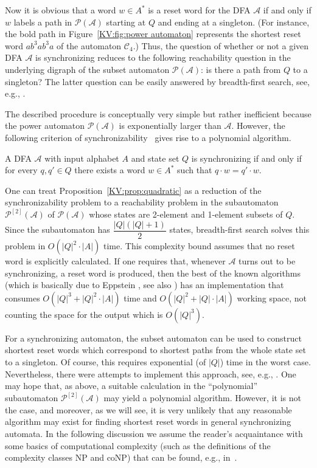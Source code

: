 \documentclass{irmaart}
\newcommand{\sa}{synchronizing au\-tom\-a\-ta}
\newcommand{\san}{synchronizing au\-tom\-a\-ton}
\begin{document}
Now it is obvious that a word $w\in A^*$ is a reset word for the
DFA $\mathcal{A}$ if and only if $w$ labels a path in
$\mathcal{P}(\mathcal{A})$ starting at $Q$ and ending at a
singleton. (For instance, the bold path in
Figure~\ref{KV:fig:power automaton} represents the shortest reset
word $ab^3ab^3a$ of the automaton $\mathcal{C}_4$.) Thus, the
question of whether or not a given DFA $\mathcal{A}$ is
synchronizing reduces to the following reachability question in
the underlying digraph of the subset automaton
$\mathcal{P}(\mathcal{A})$: is there a path from $Q$ to a
singleton? The latter question can be easily answered by
breadth-first search,  see, e.g.,
\cite[Section~22.2]{Cormen&Leiserson&Rivest&Stein:2001}.

The described procedure is conceptually very simple but rather
inefficient because the power automaton $\mathcal{P}(\mathcal{A})$
is exponentially larger than $\mathcal{A}$. However, the following
criterion of synchronizability~\cite[Theorem~2]{Cerny:1964} gives
rise to a polynomial algorithm.
\begin{proposition}
\label{KV:prop:quadratic} A DFA $\mathcal{A}$ with input alphabet
$A$ and state set $Q$ is synchronizing if and only if for every
$q,q'\in Q$ there exists a word $w\in A^*$ such that $q\cdot
w=q'\cdot w$.
\end{proposition}
One can treat Proposition~\ref{KV:prop:quadratic} as a reduction
of the synchronizability problem to a reachability problem in the
subautomaton $\mathcal{P}^{[2]}(\mathcal{A})$ of
$\mathcal{P}(\mathcal{A})$ whose states are 2-element and
1-element subsets of $Q$. Since the subautomaton has
$\dfrac{|Q|(|Q|+1)}2$ states, breadth-first search solves this
problem in $O(|Q|^2\cdot|A|)$ time. This complexity bound assumes
that no reset word is explicitly calculated. If one requires that,
whenever $\mathcal{A}$ turns out to be synchronizing, a reset word
is produced, then the best of the known algorithms (which is
basically due to Eppstein \cite[Theorem~6]{Eppstein:1990}, see
also \cite[Theorem~1.15]{Sandberg:2005}) has an implementation
that consumes $O(|Q|^3 + |Q|^2\cdot|A|)$ time and $O(|Q|^2 +
|Q|\cdot|A|)$ working space, not counting the space for the output
which is $O(|Q|^3)$.

For a \san, the subset automaton can be used to construct shortest
reset words which correspond to shortest paths from the whole
state set to a singleton. Of course, this requires exponential (of
$|Q|$) time in the worst case. Nevertheless, there were attempts
to implement this approach, see, e.g.,
\cite{Rho&Somenzi&Pixley:1993,Trahtman:2006}. One may hope that,
as above, a suitable calculation in the ``polynomial''
subautomaton $\mathcal{P}^{[2]}(\mathcal{A})$ may yield a
polynomial algorithm. However, it is not the case, and moreover,
as we will see, it is very unlikely that any reasonable algorithm
may exist for finding shortest reset words in general \sa. In the
following discussion we assume the reader's acquaintance with some
basics of computational complexity (such as the definitions of the
complexity classes \textsf{NP} and \textsf{coNP}) that can be
found, e.g., in~\cite{Garey&Johnson:1979,Papadimitriou:1994}.
\end{document}
